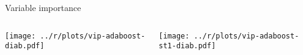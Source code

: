 \begin{frame}{Variable importance}


\begin{columns}[T]
\hspace{-2.5em}\begin{column}{0.515\textwidth}
	\texttt{[image: ../r/plots/vip-adaboost-diab.pdf]}
\end{column}
\hspace{-1.3ex}\begin{column}{0.515\textwidth}
	\texttt{[image: ../r/plots/vip-adaboost-st1-diab.pdf]}
\end{column}
\end{columns}

\end{frame}



%
%



%
%
%

